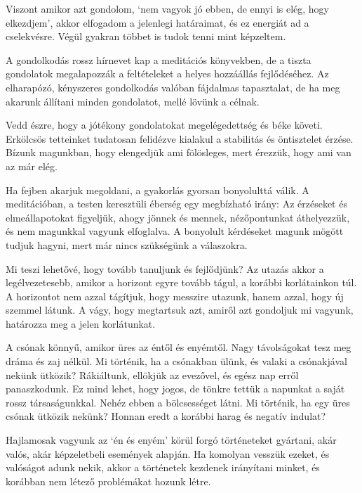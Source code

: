 
Viszont amikor azt gondolom, `nem vagyok jó ebben, de ennyi is elég,
hogy elkezdjem', akkor elfogadom a jelenlegi határaimat, és ez energiát
ad a cselekvésre. Végül gyakran többet is tudok tenni mint képzeltem.

A gondolkodás rossz hírnevet kap a meditációs könyvekben, de a tiszta
gondolatok megalapozzák a feltételeket a helyes hozzáállás fejlődéséhez.
Az elharapózó, kényszeres gondolkodás valóban fájdalmas tapasztalat, de
ha meg akarunk állítani minden gondolatot, mellé lövünk a célnak.

Vedd észre, hogy a jótékony gondolatokat megelégedettség és béke követi.
Erkölcsös tetteinket tudatosan felidézve kialakul a stabilitás és
öntisztelet érzése. Bízunk magunkban, hogy elengedjük ami fölösleges,
mert érezzük, hogy ami van az már elég.

Ha fejben akarjuk megoldani, a gyakorlás gyorsan bonyolulttá válik. A
meditációban, a testen keresztüli éberség egy megbízható irány: Az
érzéseket és elmeállapotokat figyeljük, ahogy jönnek és mennek,
nézőpontunkat áthelyezzük, és nem magunkkal vagyunk elfoglalva. A
bonyolult kérdéseket magunk mögött tudjuk hagyni, mert már nincs
szükségünk a válaszokra.


Mi teszi lehetővé, hogy tovább tanuljunk és fejlődjünk? Az utazás akkor
a legélvezetesebb, amikor a horizont egyre tovább tágul, a korábbi
korlátainkon túl. A horizontot nem azzal tágítjuk, hogy messzire
utazunk, hanem azzal, hogy új szemmel látunk. A vágy, hogy megtartsuk
azt, amiről azt gondoljuk mi vagyunk, határozza meg a jelen korlátunkat.

A csónak könnyű, amikor üres az éntől és enyémtől. Nagy távolságokat
tesz meg dráma és zaj nélkül. Mi történik, ha a csónakban ülünk, és
valaki a csónakjával nekünk ütközik? Rákiáltunk, ellökjük az evezővel,
és egész nap erről panaszkodunk. Ez mind lehet, hogy jogos, de tönkre
tettük a napunkat a saját rossz társaságunkkal. Nehéz ebben a
bölcsességet látni. Mi történik, ha egy üres csónak ütközik nekünk?
Honnan eredt a korábbi harag és negatív indulat?

Hajlamosak vagyunk az `én és enyém' körül forgó történeteket gyártani,
akár valós, akár képzeletbeli események alapján. Ha komolyan vesszük
ezeket, és valóságot adunk nekik, akkor a történetek kezdenek irányítani
minket, és korábban nem létező problémákat hozunk létre.

